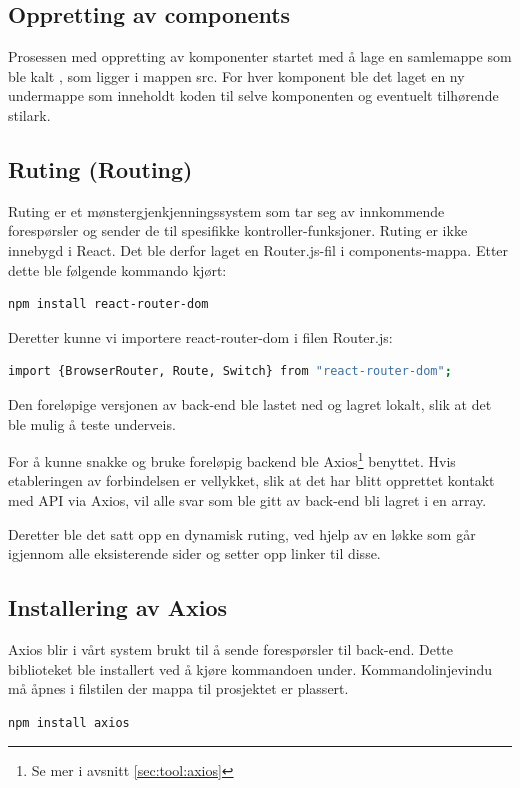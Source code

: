 \subsection{Oppretting av components}
Prosessen med oppretting av komponenter startet med å lage en samlemappe som ble kalt , som ligger i mappen src. For hver komponent ble det laget en ny undermappe som inneholdt koden til selve komponenten og eventuelt tilhørende stilark.

\subsection{Ruting (Routing)}
Ruting er et mønstergjenkjenningssystem som tar seg av innkommende forespørsler og sender de til spesifikke kontroller-funksjoner. Ruting er ikke innebygd i React. Det ble derfor laget en Router.js-fil i components-mappa. Etter dette ble følgende kommando kjørt:

\begin{lstlisting}[caption={Installering av React ruting},language=bash]
npm install react-router-dom
\end{lstlisting}

Deretter kunne vi importere react-router-dom i filen Router.js:

\begin{lstlisting}[caption={Importering av react-router-dom},language=bash]
import {BrowserRouter, Route, Switch} from "react-router-dom";
\end{lstlisting}

Den foreløpige versjonen av back-end ble lastet ned og lagret lokalt, slik at det ble mulig å teste underveis.

For å kunne snakke og bruke foreløpig backend ble Axios\footnote{Se mer i avsnitt \ref{sec:tool:axios}} benyttet. Hvis etableringen av forbindelsen er vellykket, slik at det har blitt opprettet kontakt med API via Axios, vil alle svar som ble gitt av back-end bli lagret i en array. 

Deretter ble det satt opp en dynamisk ruting, ved hjelp av en løkke som går igjennom alle eksisterende sider og setter opp linker til disse.

\subsection{Installering av Axios}
Axios blir i vårt system brukt til å sende forespørsler til back-end. Dette biblioteket ble installert ved å kjøre kommandoen under.  Kommandolinjevindu må åpnes i filstilen der mappa til prosjektet er plassert.
\begin{lstlisting}[caption={Installering av Axios},language=bash]
npm install axios
\end{lstlisting}

